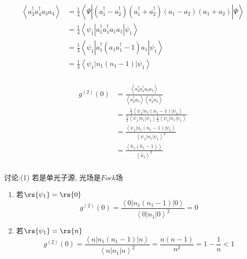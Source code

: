 \begin{frame} 
 \frametitle{}
 \[\begin{aligned}
    \left\langle a_3^{\dagger}a_4^{\dagger}a_3 a_4\right\rangle &= \frac{1}{4}\left\langle \Psi|(a^{\dagger} _{1}-a^{\dagger}_{2}) (a^{\dagger}_{1} + a^{\dagger}_{2})(a_{1}-a_{2})(a_{1}+a_{2})   |  \Psi \right\rangle \\ 
    &= \frac{1}{4}\left\langle \psi_1|a^{\dagger} _{1}a^{\dagger} _{1}a_{1}a_{1}   |  \psi_1 \right\rangle \\ 
    &= \frac{1}{4}\left\langle \psi_1|a^{\dagger} _{1}(a_{1}a^{\dagger} _{1} - 1)a_{1}   |  \psi_1 \right\rangle \\ 
    &= \frac{1}{4}\left\langle \psi_1| n_1(n_1-1) |  \psi_1 \right\rangle
\end{aligned} \]  
\end{frame}

\begin{frame} 
 \frametitle{}
 \[\begin{aligned}
    g^{(2)} (0) &= \frac{\left\langle a_3^{\dagger}a_4^{\dagger}a_3a_4  \right\rangle}{ \left\langle a_3^{\dagger}a_3 \right\rangle  \left\langle a_4^{\dagger}a_4 \right\rangle} \\
    &=  \frac{\frac{1}{4}\left\langle \psi_1| n_1(n_1 -1) |  \psi_1 \right\rangle}{\frac{1}{2}\left\langle \psi_1| n_1 |\psi_1\right\rangle \frac{1}{2}\left\langle \psi_1| n_1 |\psi_1\right\rangle } \\ 
    &=  \frac{\left\langle \psi_1| n_1(n_1-1) |  \psi_1 \right\rangle}{\left\langle \psi_1| n_1 |\psi_1\right\rangle^2 } \\ 
    &= \frac{\left\langle \hat{n}_1(\hat{n}_1-1)   \right\rangle}{\left\langle \hat{n}_1 \right\rangle^2 }
   \end{aligned} \] 
\end{frame}

\begin{frame} 
      \frametitle{}
    讨论:(1) 若是单光子源, 光场是$Fock$场
    \begin{enumerate}
        \item 若$\rs{\psi_1  }=\rs{0} $ \\ 
         \[g^{(2)}(0) = \frac{\left\langle 0| n_1(n_1-1) |  0 \right\rangle}{\left\langle 0| n_1 |0\right\rangle^2 } =0\]

        \item 若$\rs{\psi_1  }=\rs{n} $  \\ 
         \[g^{(2)}(0)= \frac{\left\langle n| n_1(n_1-1) |  n \right\rangle}{\left\langle n| n_1 |n \right\rangle^2 }=\frac{n(n-1)}{n^2}=1-\dfrac{1}{n}<1\]
    \end{enumerate}
   \end{frame}

